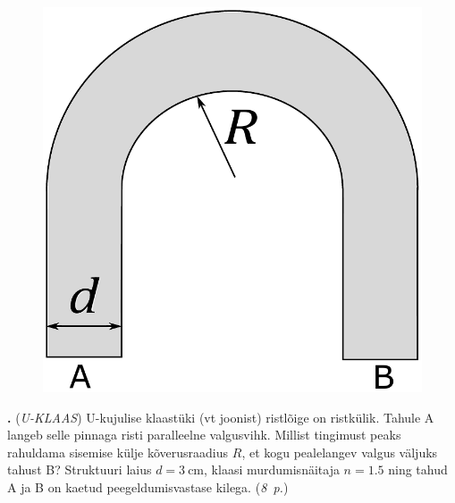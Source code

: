 \documentclass[11pt,a5paper]{article}
\newcommand{\numb}[1]{\vspace{5pt}\textbf{\large #1}}
\newcommand{\nimi}[1]{(\textsl{\small #1})}
\newcommand{\punktid}[1]{(\emph{#1~p.})}
\newcommand{\autor}[1]{}
\newcounter{ylesanne}
\newcommand{\yl}[1]{\addtocounter{ylesanne}{1}\numb{\theylesanne.} \nimi{#1} \newblock{}}
\begin{document}
	
	\vspace{-10pt}
	\begin{figure}
		\vspace{-10pt}
		\includegraphics[width=\linewidth]{uklaas_yl.pdf}
	\end{figure}
	\yl{U-KLAAS} 
	U-kujulise klaastüki (vt joonist) ristlõige on ristkülik. Tahule A langeb selle pinnaga risti paralleelne valgusvihk.  Millist tingimust peaks rahuldama sisemise külje kõverusraadius $R$, et kogu pealelangev valgus väljuks tahust B? Struktuuri laius $d=\SI{3}{\cm}$, klaasi murdumisnäitaja $n=\num{1.5}$ ning tahud A ja B on kaetud peegeldumisvastase kilega.
	\punktid{8} \autor{Hans Daniel Kaimre}
	
\end{document}
